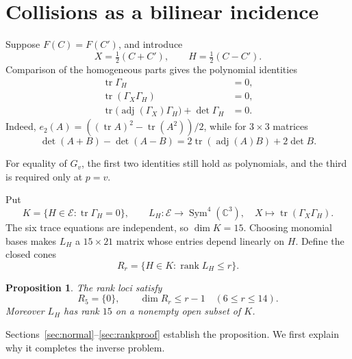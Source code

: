\documentclass[11pt]{amsart}
\newtheorem{proposition}[theorem]{Proposition}
\theoremstyle{remark}
\newcommand{\C}{\mathbb C}
\newcommand{\E}{\mathcal E}
\newcommand{\tr}{\operatorname{tr}}
\newcommand{\rank}{\operatorname{rank}}
\newcommand{\adj}{\operatorname{adj}}
\newcommand{\Sym}{\operatorname{Sym}}
\begin{document}
\section{Collisions as a bilinear incidence}

Suppose $F(C)=F(C')$, and introduce
\[
 X=\tfrac12(C+C'),\qquad H=\tfrac12(C-C').
\]
Comparison of the homogeneous parts gives the polynomial identities
\begin{align}
 \tr\Gamma_H&=0,\label{eq:tracezero}\\
 \tr(\Gamma_X\Gamma_H)&=0,\label{eq:bilinear}\\
 \tr\bigl(\adj(\Gamma_X)\Gamma_H\bigr)+\det\Gamma_H&=0.
 \label{eq:cubic}
\end{align}
Indeed, $e_2(A)=((\tr A)^2-\tr(A^2))/2$, while for $3\times3$ matrices
\[
 \det(A+B)-\det(A-B)=2\tr(\adj(A)B)+2\det B.
\]

For equality of $G_v$, the first two identities still hold as polynomials, and the third is required only at $p=v$.

Put
\[
 K=\{H\in\E:\tr\Gamma_H=0\},\qquad
 L_H:\E\longrightarrow\Sym^4(\C^3),\quad
 X\longmapsto\tr(\Gamma_X\Gamma_H).
\]
The six trace equations are independent, so $\dim K=15$. Choosing monomial bases makes $L_H$ a $15\times21$ matrix whose entries depend linearly on $H$. Define the closed cones
\begin{equation}\label{eq:rankloci}
 R_r=\{H\in K:\rank L_H\leq r\}.
\end{equation}

\begin{proposition}\label{prop:rankbounds}
The rank loci satisfy
\[
 R_5=\{0\},\qquad \dim R_r\leq r-1\quad(6\leq r\leq14).
\]
Moreover $L_H$ has rank $15$ on a nonempty open subset of $K$.
\end{proposition}

Sections~\ref{sec:normal}--\ref{sec:rankproof} establish the proposition. We first explain why it completes the inverse problem.
\end{document}
